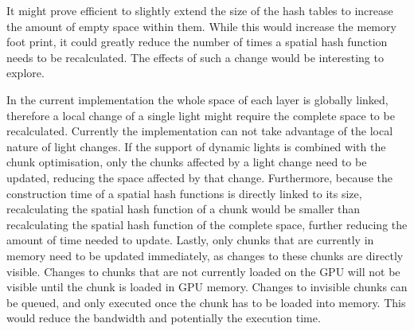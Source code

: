 It might prove efficient to slightly extend the size of the hash tables to increase the amount
of empty space within them. While this would increase the memory foot print, it could greatly reduce the
number of times a spatial hash function needs to be recalculated. The effects of such a change
would be interesting to explore.

In the current implementation the whole space of each layer is globally linked, therefore a local
change of a single light might require the complete space to be recalculated. Currently the implementation
can not take advantage of the local nature of light changes. If the support of dynamic lights is combined
with the chunk optimisation, only the chunks affected by a light change need to be updated, reducing the
space affected by that change. Furthermore, because the construction
time of a spatial hash functions is directly linked to its size, recalculating the spatial hash function
of a chunk would be smaller than recalculating the spatial hash function of the complete space, 
further reducing the amount of time needed to update.
Lastly, only chunks that are currently in memory need to be updated immediately, as changes to these
chunks are directly visible. Changes to chunks that are not currently loaded on the GPU will not be visible
until the chunk is loaded in GPU memory. Changes to invisible chunks can be queued, and only executed
once the chunk has to be loaded into memory. This would reduce the bandwidth and potentially the
execution time.

